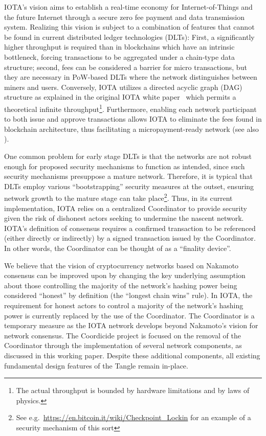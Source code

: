 \documentclass[../main.tex]{subfiles}
\begin{document}
IOTA's vision aims to establish a real-time economy for Internet-of-Things and the future Internet through a secure zero fee payment and data transmission system.
Realizing this vision is subject to a combination of features that cannot be found in current distributed ledger technologies (DLTs): First, a significantly higher throughput is required than in blockchains which have an intrinsic bottleneck, forcing transactions to be aggregated under a chain-type data structure; second, fees can be considered a barrier for micro transactions, but they are necessary in PoW-based DLTs where the network distinguishes between miners and users.
Conversely, IOTA utilizes a directed acyclic graph (DAG) structure as explained in the original IOTA white paper~\cite{popov2018} which permits a theoretical infinite throughput\footnote{The actual throughput is bounded by hardware limitations and by laws of physics.}. Furthermore, enabling each network participant to both issue and approve transactions allows IOTA to eliminate the fees found in blockchain architecture, thus facilitating a micropayment-ready network (see also \cite{popov2019feelessfree}).


One common problem for early stage DLTs is that the networks are not robust enough for proposed security mechanisms to function as intended, since such security mechanisms presuppose a mature network. Therefore, it is typical that DLTs employ various ``bootstrapping'' security measures at the outset, ensuring network growth to the mature stage can take place\footnote{%
See e.g.\ \url{https://en.bitcoin.it/wiki/Checkpoint_Lockin}
for an example of a security mechanism of this sort}. Thus, in its current implementation, IOTA relies on a centralized Coordinator to provide security given the risk of dishonest actors seeking to undermine the nascent network. IOTA's definition of consensus requires a confirmed transaction to be referenced (either directly or indirectly) by a signed transaction issued by the Coordinator. In other words, the Coordinator can be thought of as a ``finality device''.

We believe that the vision of cryptocurrency networks based on Nakamoto consensus can be improved upon by changing the key underlying assumption about those controlling the majority of the network's hashing power being considered \enquote{honest} by definition (the ``longest chain wins'' rule). In IOTA, the requirement for honest actors to control a majority of the network's hashing power is currently replaced by the use of the Coordinator. The Coordinator is a temporary measure as the IOTA network develops beyond Nakamoto's vision for network consensus.
The Coordicide project is focused on the removal of the Coordinator through the implementation of several network components, as discussed in this working paper. 
Despite these additional components, all existing fundamental design features of the Tangle remain in-place.
\end{document}
